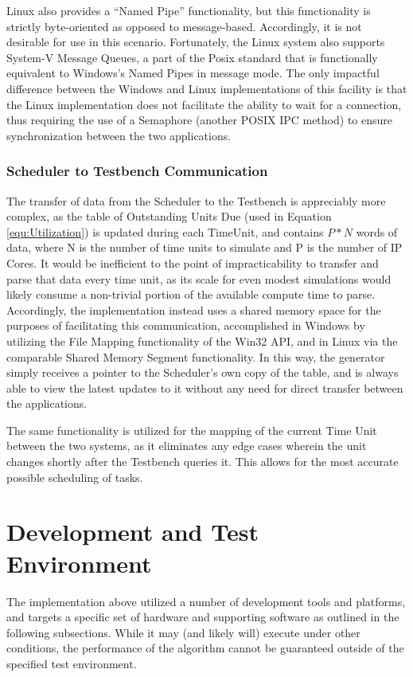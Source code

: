 Linux also provides a ``Named Pipe'' functionality, but this functionality is strictly byte-oriented as opposed to message-based. Accordingly, it is not desirable for use in this scenario. Fortunately, the Linux system also supports System-V Message Queues, a part of the Posix standard that is functionally equivalent to Windows's Named Pipes in message mode. The only impactful difference between the Windows and Linux implementations of this facility is that the Linux implementation does not facilitate the ability to wait for a connection, thus requiring the use of a Semaphore (another POSIX IPC method) to ensure synchronization between the two applications.

\subsubsection{Scheduler to Testbench Communication}\label{subsubsec:SchedTestbenchIPC}
The transfer of data from the Scheduler to the Testbench is appreciably more complex, as the table of Outstanding Units Due (used in Equation \ref{equ:Utilization}) is updated during each TimeUnit, and contains $P*N$ words of data, where N is the number of time units to simulate and P is the number of IP Cores. It would be inefficient to the point of impracticability to transfer and parse that data every time unit, as its scale for even modest simulations would likely consume a non-trivial portion of the available compute time to parse. Accordingly, the implementation instead uses a shared memory space for the purposes of facilitating this communication, accomplished in Windows by utilizing the File Mapping functionality of the Win32 API, and in Linux via the comparable Shared Memory Segment functionality. In this way, the generator simply receives a pointer to the Scheduler's own copy of the table, and is always able to view the latest updates to it without any need for direct transfer between the applications.

The same functionality is utilized for the mapping of the current Time Unit between the two systems, as it eliminates any edge cases wherein the unit changes shortly after the Testbench queries it. This allows for the most accurate possible scheduling of tasks.

\section{Development and Test Environment}\label{sec:environment}
The implementation above utilized a number of development tools and platforms, and targets a specific set of hardware and supporting software as outlined in the following subsections. While it may (and likely will) execute under other conditions, the performance of the algorithm cannot be guaranteed outside of the specified test environment.

